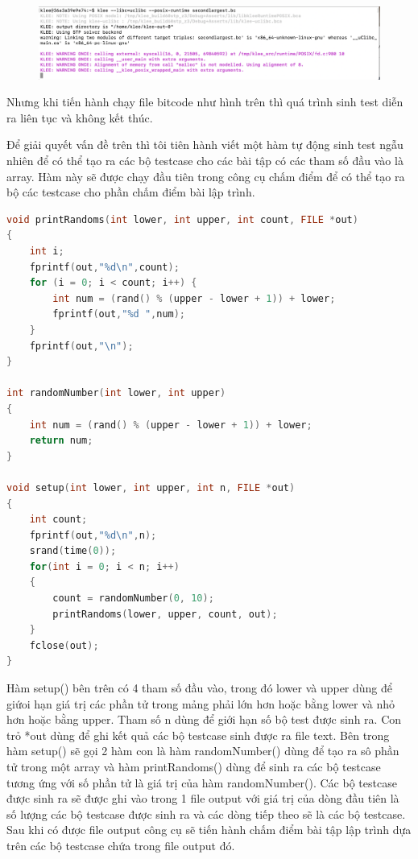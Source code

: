 \documentclass[12pt,a4paper]{article}
\begin{document}
\begin{figure}[ht]
\begin{center}
\includegraphics[scale=.3]{hinhanh/runningkleearray.png}
\end{center}
\end{figure}

Nhưng khi tiến hành chạy file bitcode như hình trên thì quá trình sinh test diễn ra liên tục và không kết thúc. 

Để giải quyết vấn đề trên thì tôi tiên hành viết một hàm tự động sinh test ngẫu nhiên để có thể tạo ra các bộ testcase cho các bài tập có các tham số đầu vào là array. Hàm này sẽ được chạy đầu tiên trong công cụ chấm điểm để có thể tạo ra bộ các testcase cho phần chấm điểm bài lập trình.

\begin{lstlisting}[language=c]
void printRandoms(int lower, int upper, int count, FILE *out) 
{ 
    int i;
    fprintf(out,"%d\n",count);
    for (i = 0; i < count; i++) { 
        int num = (rand() % (upper - lower + 1)) + lower; 
        fprintf(out,"%d ",num); 
    }
    fprintf(out,"\n"); 
} 

int randomNumber(int lower, int upper)
{
    int num = (rand() % (upper - lower + 1)) + lower; 
    return num;
}

void setup(int lower, int upper, int n, FILE *out)
{
    int count;
    fprintf(out,"%d\n",n);
    srand(time(0)); 
    for(int i = 0; i < n; i++)
    {
        count = randomNumber(0, 10);
        printRandoms(lower, upper, count, out);
    } 
    fclose(out);
}
\end{lstlisting}

Hàm setup() bên trên có 4 tham số đầu vào, trong đó lower và upper dùng để giứoi hạn giá trị các phần tử trong mảng phải lớn hơn hoặc bằng lower và nhỏ hơn hoặc bằng upper. Tham số n dùng để giới hạn số bộ test được sinh ra. Con trỏ *out dùng để ghi kết quả các bộ testcase sinh được ra file text. Bên trong hàm setup() sẽ gọi 2 hàm con là hàm randomNumber() dùng để tạo ra sô phần tử trong một array và hàm printRandoms() dùng để sinh ra các bộ testcase tương ứng với số phần tử là giá trị của hàm randomNumber(). Các bộ testcase được sinh ra sẽ được ghi vào trong 1 file output với giá trị của dòng đầu tiên là số lượng các bộ testcase được sinh ra và các dòng tiếp theo sẽ là các bộ testcase.
Sau khi có được file output công cụ sẽ tiến hành chấm điểm bài tập lập trình dựa trên các bộ testcase chứa trong file output đó.
\end{document}

